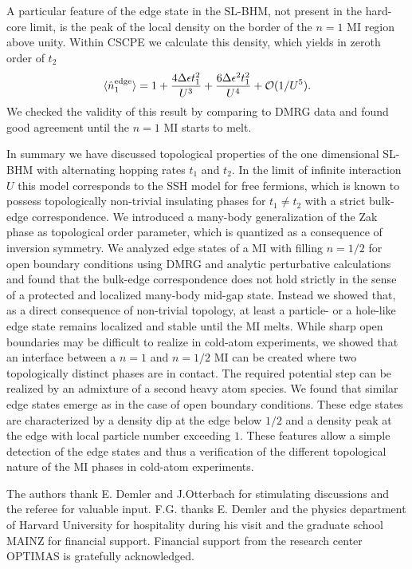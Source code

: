 \documentclass[pra,aps,twocolumn,showpacs]{revtex4}
\begin{document}
A particular feature of the edge state in the SL-BHM, not present in the hard-core limit,
is the peak of the local density on the border of the $n=1$ MI region above unity. Within CSCPE 
we calculate this density, which yields in zeroth order of $t_2$
%
%
\begin{equation}
 \langle \hat{n}_{1}^{\rm edge} \rangle= 1+\frac{4 \Delta \epsilon 
 t_1^2}{U^3}+\frac{6 \Delta \epsilon ^2
   t_1^2}{U^4}+\mathcal{O}(1/U^5).
\label{eq:edge-density}
\end{equation}
%
%
We checked the validity of this result by comparing to DMRG data and found good agreement until 
the $n=1$ MI starts to melt.

In summary we have discussed topological properties of the one dimensional SL-BHM
with alternating hopping rates $t_1$ and $t_2$. In the limit of infinite interaction $U$ this model corresponds to the SSH model for free fermions, which is known to possess topologically
non-trivial insulating phases for $t_1\ne t_2$ with a strict bulk-edge correspondence. We 
introduced a many-body generalization of the Zak phase
as topological order parameter, which is quantized as a consequence of inversion symmetry.
We analyzed edge states of a MI with filling $n=1/2$ 
for open boundary conditions using DMRG and analytic perturbative
calculations and found that the bulk-edge correspondence does not hold strictly in the sense of
a protected and localized many-body mid-gap state. Instead we showed that, as a direct consequence
of non-trivial topology, at least a particle- or a hole-like edge state remains localized and stable 
until the MI melts. While sharp open boundaries may be difficult to realize in cold-atom experiments, we showed that an interface between a $n=1$ and $n=1/2$ MI can be created where two topologically distinct phases are in contact. The required potential step can be realized by an admixture
of a second heavy atom species. We found that similar edge states emerge as in the case of
open boundary conditions. These edge states are characterized by a density dip at the edge 
below $1/2$ and a density peak at the edge 
with local particle number exceeding $1$. These features allow a simple detection
of the edge states and thus a verification of the different 
topological nature of the MI phases in cold-atom experiments.

The authors thank E. Demler and J.Otterbach for stimulating discussions and the referee for valuable input.
F.G. thanks E. Demler and the physics department of Harvard University for hospitality 
during his visit and the graduate school MAINZ for financial support. Financial support from 
the research center OPTIMAS is gratefully
acknowledged.
\end{document}
